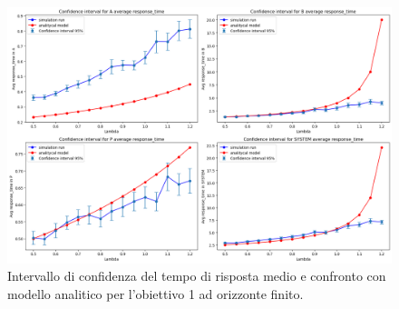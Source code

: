 \begin{figure}
    \centering
    \includegraphics[width=\textwidth]{figs//results/obj1/obj1-line-response-time-rep.png}
    \caption{Intervallo di confidenza del tempo di risposta medio e confronto con modello analitico per l'obiettivo 1 ad orizzonte finito.}
    \label{fig:obj1_line_response_time-rep}
\end{figure}
